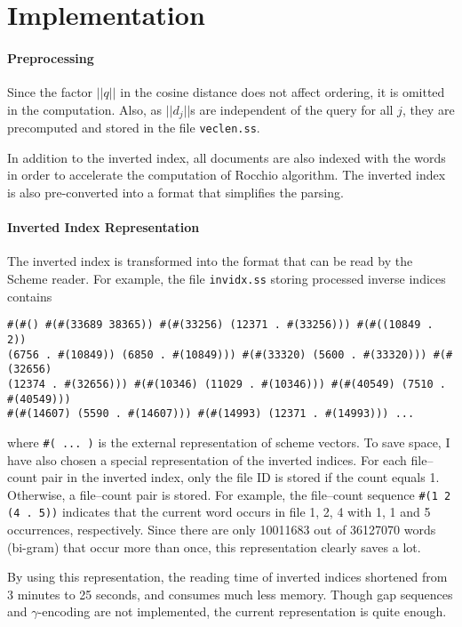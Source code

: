 \documentclass{article}
\begin{document}
\section{Implementation}
\paragraph{Preprocessing} Since the factor $||q||$ in the cosine distance does not affect
ordering, it is omitted in the computation. Also, as $||d_j||$s are independent of the query
for all $j$, they are precomputed and stored in the file \texttt{veclen.ss}.

In addition to the inverted index, all documents are also indexed with the words in order to
accelerate the computation of Rocchio algorithm. The inverted index is also pre-converted into
a format that simplifies the parsing.
\paragraph{Inverted Index Representation} The inverted index is transformed into the format that
can be read by the Scheme reader. For example, the file \texttt{invidx.ss} storing processed inverse
indices contains

\begin{verbatim}
#(#() #(#(33689 38365)) #(#(33256) (12371 . #(33256))) #(#((10849 . 2))
(6756 . #(10849)) (6850 . #(10849))) #(#(33320) (5600 . #(33320))) #(#(32656)
(12374 . #(32656))) #(#(10346) (11029 . #(10346))) #(#(40549) (7510 . #(40549)))
#(#(14607) (5590 . #(14607))) #(#(14993) (12371 . #(14993))) ...
\end{verbatim}

where \texttt{\#( ... )} is the external representation of scheme vectors. To save space, I have also
chosen a special representation of the inverted indices. For each file--count pair in the inverted
index, only the file ID is stored if the count equals 1. Otherwise, a file--count pair is stored.
For example, the file--count sequence \texttt{\#(1 2 (4 . 5))} indicates that the current word occurs
in file 1, 2, 4 with 1, 1 and 5 occurrences, respectively. Since there are only 10011683 out of 36127070
words (bi-gram) that occur more than once, this representation clearly saves a lot.

By using this representation, the reading time of inverted indices shortened from 3 minutes to 25 seconds,
and consumes much less memory. Though gap sequences and $\gamma$-encoding are not implemented, the current
representation is quite enough.
\end{document}
